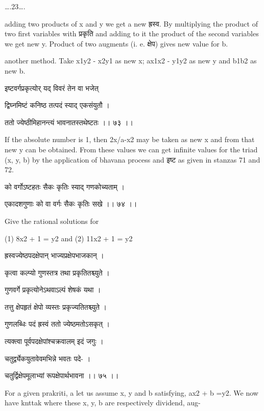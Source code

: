 \documentclass[]{article}
\date{}
\begin{document}
{\ldots{}.23\ldots{}.}

{adding two products of x and y we get a new ह्रस्व. By multiplying the
product of two first variables with प्रकृति and adding to it the product
of the second variables we get new y. Product of two augments (i. e.
क्षेप) gives new value for b.}

{another method. Take x}{1}{y}{2}{ - x}{2}{y}{1}{ as new x;
ax}{1}{x}{2}{ - y}{1}{y}{2}{ as new y and b}{1}{b}{2}{ as new b.}

{इष्टवर्गप्रकृत्योर् यद् विवरं तेन वा भजेत् }

{द्विघ्नमिष्टं कनि}{ष्ठ}{ तत्पदं स्याद् एकसंयुतौ । }

{ततो ज्येष्ठीमिहानन्त्यं भावनातस्तथेष्टतः ।। ७३ ।। }

{If the absolute number is 1, then 2x/a-x}{2}{ may be taken as new x and
from that new y can be obtained. From these values we can get infinite
values for the triad (x, y, b) by the application of bhavana process and
इष्ट as given in stanzas 71 and 72.}

{को वर्गोऽष्टहतः सैकः कृतिः स्याद् गणकोच्यताम् । }

{एकादशगुणाः को वा वर्गः सैकः कृतिः सखे ।। ७४ ।। }

{Give the rational solutions for}

{(1) 8x}{2}{ + 1 = y}{2}{ and (2) 11x}{2}{ + 1 = y}{2}

{ह्रस्वज्येष्ठपदक्षेपान् भाज्यप्रक्षेपभाजकान् । }

{कृत्वा कल्प्यो गुणस्तत्र तथा प्रकृतितश्च्युते । }

{गुणवर्गे प्रकृत्योनेऽथवाऽल्पं शेषकं यथा । }

{तत्तु क्षेपहृतं क्षेपो व्यस्तः प्रकृज्यतितश्च्युते । }

{गुणलब्धिः पदं ह्रस्वं ततो ज्येष्ठमतोऽसकृत् । }

{त्यक्त्वा पूर्वपदक्षेपांश्चक्रवालम् इदं जगुः । }

{चतुर्द्व्येकयुतावेवमभिन्ने भवतः पदे- । }

{चतुर्द्विक्षेपमूलाभ्यां रूपक्षेपार्थभावना ।। ७५ ।। }

{For a given prakriti, a let us assume x, y and b satisfying, ax}{2}{ +
b =y}{2}{. We now have knttak where these x, y, b are respectively
dividend, aug-\\
}
\end{document}
